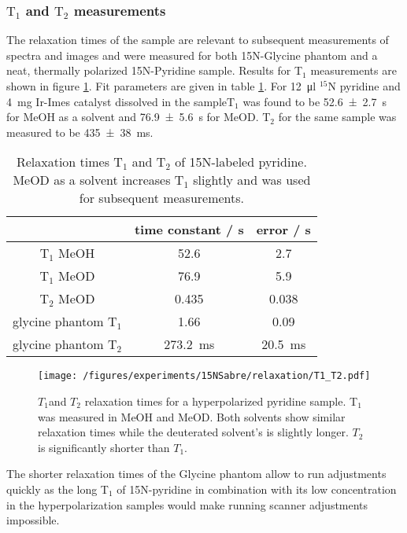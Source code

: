     \subsubsection{$\mathrm{T_1}$ and $\mathrm{T_2}$ measurements}
    The relaxation times of the sample are relevant to subsequent measurements of spectra and images and were measured for both 15N-Glycine phantom and a neat, thermally polarized 15N-Pyridine sample.
    Results for T$_1$ measurements are shown in figure \ref{fig:results:T1T2}. Fit parameters are given in table \ref{table:results:T1T2}. For \SI{12}{\micro\litre} $^{15}$N pyridine and \SI{4}{\milli\gram} Ir-Imes catalyst dissolved in the sample$\mathrm{T}_1$ was found to be \SI{52.6\pm 2.7}{\second} for MeOH as a solvent and \SI{76.9\pm 5.6}{\second} for MeOD. $\mathrm{T}_2$ for the same sample was measured to be \SI{435\pm 38}{\milli\second}.
        \begin{table}
            \centering
            \begin{tabular}{|c|c|c|}
                \hline
                    & time constant / s & error / s\\
                    \hline
                $\mathrm{T_1}$ MeOH & 52.6 & 2.7  \\
                $\mathrm{T_1}$ MeOD & 76.9 & 5.9  \\
                $\mathrm{T_2}$ MeOD &  0.435 & 0.038 \\
                glycine phantom $\mathrm{T_1}$& 1.66& 0.09 \\
                glycine phantom $\mathrm{T_2}$&\SI{273.2}{\milli\second} & \SI{20.5}{\milli\second} \\
                \hline
            \end{tabular}
            \caption[Relaxation times]{Relaxation times T$_1$ and T$_2$ of 15N-labeled pyridine. MeOD as a solvent increases T$_1$ slightly and was used for subsequent measurements.}
            \label{table:results:T1T2}
        \end{table}
        \begin{figure}
            \texttt{[image: /figures/experiments/15NSabre/relaxation/T1\_T2.pdf]}
            \caption[T1/T2 of 15N]{$T_1$and $T_2$ relaxation times for a hyperpolarized pyridine sample. T$_1$ was measured in MeOH and MeOD. Both solvents show similar relaxation times while the deuterated solvent's is slightly longer. $T_2$ is significantly shorter than $T_1$.}
            \label{fig:results:T1T2}
        \end{figure}
        The shorter relaxation times of the Glycine phantom allow to run adjustments quickly as the long T$_1$ of 15N-pyridine in combination with its low concentration in the hyperpolarization samples would make running scanner adjustments impossible.
